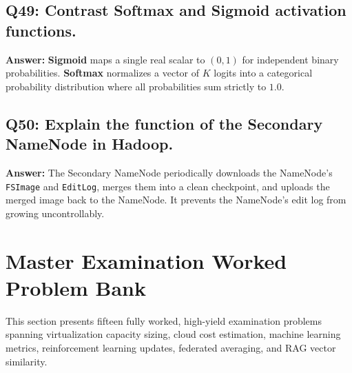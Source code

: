 \subsection*{Q49: Contrast Softmax and Sigmoid activation functions.}
\textbf{Answer:} \textbf{Sigmoid} maps a single real scalar to $(0, 1)$ for independent binary probabilities. \textbf{Softmax} normalizes a vector of $K$ logits into a categorical probability distribution where all probabilities sum strictly to $1.0$.

\subsection*{Q50: Explain the function of the Secondary NameNode in Hadoop.}
\textbf{Answer:} The Secondary NameNode periodically downloads the NameNode's \texttt{FSImage} and \texttt{EditLog}, merges them into a clean checkpoint, and uploads the merged image back to the NameNode. It prevents the NameNode's edit log from growing uncontrollably.



\section{Master Examination Worked Problem Bank}
\label{sec:cloud_ml_worked_problems}

This section presents fifteen fully worked, high-yield examination problems spanning virtualization capacity sizing, cloud cost estimation, machine learning metrics, reinforcement learning updates, federated averaging, and RAG vector similarity.


